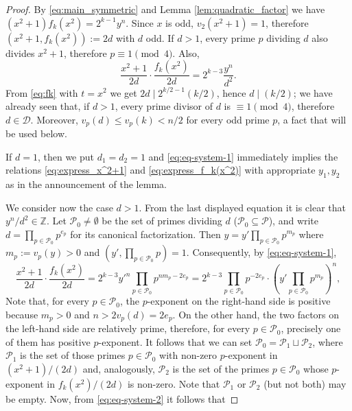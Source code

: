 \documentclass[10pt,a4paper]{amsart}
\newcommand{\ZZ}{\mathbb{Z}}
\newcommand{\cD}{\mathcal{D}}
\newcommand{\cP}{\mathcal{P}}
\begin{document}
\begin{proof}
By \eqref{eq:main_symmetric} and  Lemma \ref{lem:quadratic_factor} we have $(x^2+1)f_k(x^2)=2^{k-1}y^n$. Since $x$ is odd, $v_2(x^2+1)=1$, therefore $(x^2+1,f_k(x^2)):=2d$ with $d$ odd. If $d>1$, every prime $p$ dividing $d$ also divides $x^2+1$, therefore $p\equiv 1\pmod 4$. Also,
\begin{equation} \label{eq:eq-system-1}
    \frac{x^2+1}{2d}\cdot\frac{f_k(x^2)}{2d}=2^{k-3}\frac{y^n}{d^2}.
\end{equation}
From \eqref{eq:fk} with $t=x^2$ we get $2d\mid 2^{k/2-1}(k/2)$, hence $d\mid (k/2)$; we have already seen that, if $d>1$, every prime divisor of $d$ is $\equiv 1\pmod 4$, therefore $d\in \cD$. Moreover, $v_p(d)\le v_p(k)<n/2$ for every odd prime $p$, a fact that will be used below.

If $d=1$, then we put $d_1=d_2=1$ and \eqref{eq:eq-system-1} 
immediately implies the relations \eqref{eq:express_x^2+1} and
\eqref{eq:express_f_k(x^2)} with appropriate $y_1,y_2$ as in
the announcement of the lemma.

We consider now the case $d>1$.
From the last displayed equation it is clear that $y^n/d^2\in\ZZ$. 
Let $\cP_0\neq\emptyset$ be the set of primes dividing $d$ 
($\cP_0\subseteq\cP$), and write 
$d=\prod_{p\in \cP_0}p^{e_p}$ for its canonical factorization. 
Then $y=y'\prod_{p\in \cP_0}p^{m_p}$  where $m_p:=v_{p}(y)>0$ and  
$(y',\prod_{p\in \cP_0}p)=1$. Consequently, by \eqref{eq:eq-system-1},
%
\begin{equation} \label{eq:eq-system-2}
    \frac{x^2+1}{2d}\cdot\frac{f_k(x^2)}{2d}= 
 2^{k-3}y'^n\prod_{p\in \cP_0}p^{nm_p-2e_p}
=2^{k-3}\prod_{p\in \cP_0}p^{-2e_p}\cdot
\left(y'\prod_{p\in \cP_0}p^{m_p}\right)^n,
\end{equation}
%
Note that, for every $p\in \cP_0$, the $p$-exponent on the right-hand side is positive because $m_p>0$ and $n>2v_p(d)=2e_p$. On the other hand, the two factors on the left-hand side are relatively prime, therefore, for every $p\in \cP_0$, precisely one of them has positive $p$-exponent. It follows that we can set  $\cP_0=\cP_1\sqcup \cP_2$, where $\cP_1$ is the set of those primes $p\in \cP_0$ with non-zero $p$-exponent in $(x^2+1)/(2d)$ and, analogously, $\cP_2$ is the set of the primes $p\in \cP_0$ whose $p$-exponent in $f_k(x^2)/(2d)$ is non-zero. Note that $\cP_1$ or $\cP_2$ (but not both) may be empty. Now, from \eqref{eq:eq-system-2} it follows that 


\end{proof}
\end{document}
